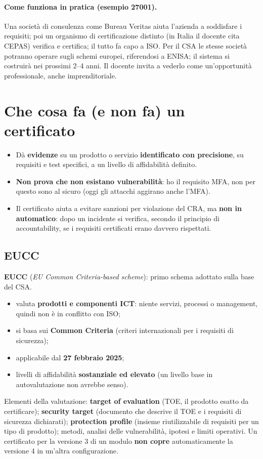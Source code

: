 \paragraph{Come funziona in pratica (esempio 27001).} Una società di consulenza come Bureau Veritas aiuta
l'azienda a soddisfare i requisiti; poi un organismo di certificazione distinto (in Italia il docente
cita CEPAS) verifica e certifica; il tutto fa capo a ISO. Per il CSA le stesse società potranno operare
sugli schemi europei, riferendosi a ENISA; il sistema si costruirà nei prossimi 2--4 anni. Il docente
invita a vederlo come un'opportunità professionale, anche imprenditoriale.

\section{Che cosa fa (e non fa) un certificato}
\begin{itemize}
  \item Dà \textbf{evidenze} su un prodotto o servizio \textbf{identificato con precisione}, su requisiti e
    test specifici, a un livello di affidabilità definito.
  \item \textbf{Non prova che non esistano vulnerabilità}: ho il requisito MFA, non per questo sono al
    sicuro (oggi gli attacchi aggirano anche l'MFA).
  \item Il certificato aiuta a evitare sanzioni per violazione del CRA, ma \textbf{non in automatico}: dopo
    un incidente si verifica, secondo il principio di accountability, se i requisiti certificati erano
    davvero rispettati.
\end{itemize}

\subsection{EUCC}
\textbf{EUCC} (\emph{EU Common Criteria-based scheme}): primo schema adottato sulla base del CSA.
\begin{itemize}
  \item valuta \textbf{prodotti e componenti ICT}: niente servizi, processi o management, quindi non è in
    conflitto con ISO;
  \item si basa sui \textbf{Common Criteria} (criteri internazionali per i requisiti di sicurezza);
  \item applicabile dal \textbf{27 febbraio 2025};
  \item livelli di affidabilità \textbf{sostanziale ed elevato} (un livello base in autovalutazione non
    avrebbe senso).
\end{itemize}
Elementi della valutazione: \textbf{target of evaluation} (TOE, il prodotto esatto da certificare);
\textbf{security target} (documento che descrive il TOE e i requisiti di sicurezza dichiarati);
\textbf{protection profile} (insieme riutilizzabile di requisiti per un tipo di prodotto); metodi, analisi
delle vulnerabilità, ipotesi e limiti operativi. Un certificato per la versione 3 di un modulo
\textbf{non copre} automaticamente la versione 4 in un'altra configurazione.


